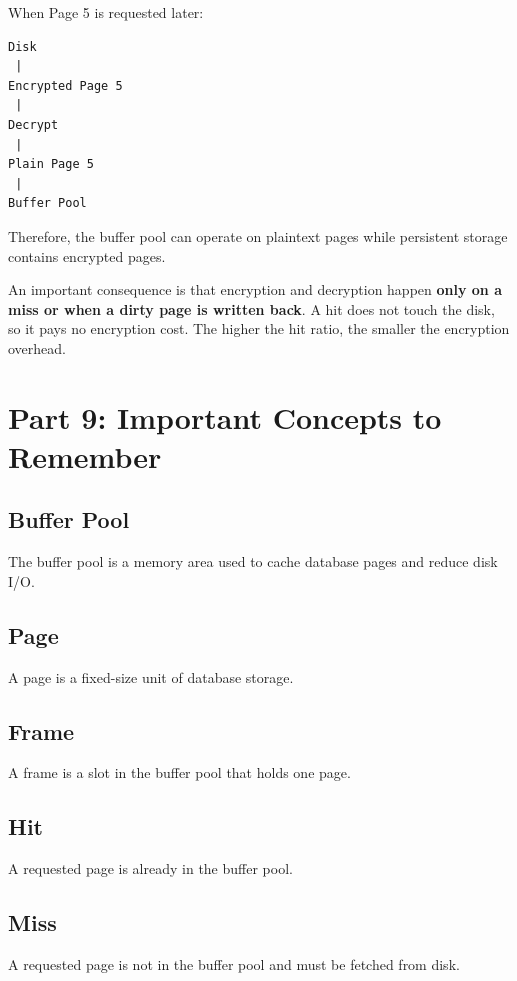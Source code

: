 \documentclass[12pt,a4paper]{article}
\begin{document}
When Page 5 is requested later:

\begin{verbatim}
Disk
 |
Encrypted Page 5
 |
Decrypt
 |
Plain Page 5
 |
Buffer Pool
\end{verbatim}

Therefore, the buffer pool can operate on plaintext pages while persistent storage contains encrypted pages.

An important consequence is that encryption and decryption happen \textbf{only on a miss or when a dirty page is written back}. A hit does not touch the disk, so it pays no encryption cost. The higher the hit ratio, the smaller the encryption overhead.

\section{Part 9: Important Concepts to Remember}

\subsection*{Buffer Pool}

The buffer pool is a memory area used to cache database pages and reduce disk I/O.

\subsection*{Page}

A page is a fixed-size unit of database storage.

\subsection*{Frame}

A frame is a slot in the buffer pool that holds one page.

\subsection*{Hit}

A requested page is already in the buffer pool.

\subsection*{Miss}

A requested page is not in the buffer pool and must be fetched from disk.
\end{document}
